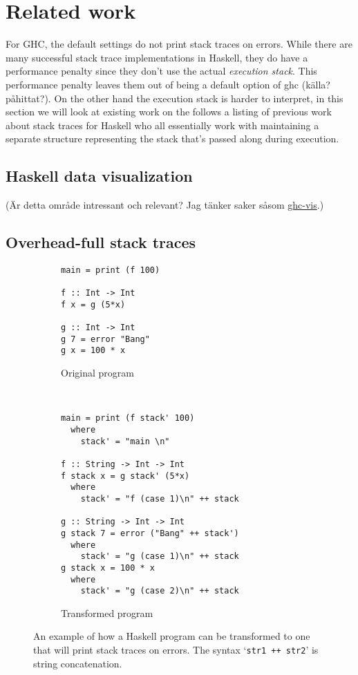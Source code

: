\section{Related work}

For GHC, the default settings do not print stack traces on errors. While there
are many successful stack trace implementations in Haskell, they do have a
performance penalty since they don't use the actual \emph{execution stack}.  This
performance penalty leaves them out of being a default option of ghc (källa?
påhittat?).
On the other hand the execution stack is harder to interpret, in this section
we will look at existing work on the 
follows a listing of previous work about stack traces for Haskell who all
essentially work with maintaining a separate structure representing the stack
that's passed along during execution.

\subsection{Haskell data visualization}

(Är detta område intressant och relevant? Jag tänker saker såsom
\href{http://felsin9.de/nnis/ghc-vis/}{ghc-vis}.)

\subsection{Overhead-full stack traces}

\begin{figure}
        \begin{subfigure}[t]{0.5\textwidth}
            \begin{verbatim}
main = print (f 100)

f :: Int -> Int
f x = g (5*x)

g :: Int -> Int
g 7 = error "Bang"
g x = 100 * x
            \end{verbatim}
            \caption{Original program}
        \end{subfigure}
        ~ %
        \begin{subfigure}[t]{0.5\textwidth}
          \begin{verbatim}
main = print (f stack' 100)
  where
    stack' = "main \n"

f :: String -> Int -> Int
f stack x = g stack' (5*x)
  where
    stack' = "f (case 1)\n" ++ stack

g :: String -> Int -> Int
g stack 7 = error ("Bang" ++ stack')
  where
    stack' = "g (case 1)\n" ++ stack
g stack x = 100 * x
  where
    stack' = "g (case 2)\n" ++ stack
          \end{verbatim}
          \caption{Transformed program}
        \end{subfigure}
        \caption{An example of how a Haskell program can be transformed to one
          that will print stack traces on errors. The syntax `\texttt{str1 ++
            str2}' is string concatenation.
        }\label{fig:transformation}
\end{figure}

